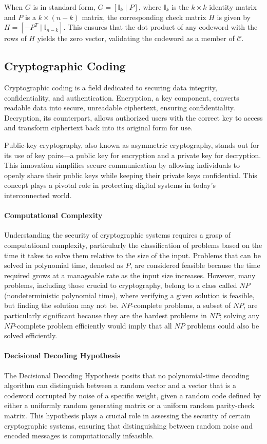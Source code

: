 When \(G\) is in standard form, \( G = [\mathbb{I}_k \mid P] \), where \(\mathbb{I}_k\) is the \(k \times k\) identity matrix and \(P\) is a \(k \times (n-k)\) matrix, the corresponding check matrix \(H\) is given by \( H = [-P^T \mid \mathbb{I}_{n-k}] \). This ensures that the dot product of any codeword with the rows of \(H\) yields the zero vector, validating the codeword as a member of \(\mathcal{C}\).

\subsection{Cryptographic Coding}
Cryptographic coding is a field dedicated to securing data integrity, confidentiality, and authentication. Encryption, a key component, converts readable data into secure, unreadable ciphertext, ensuring confidentiality. Decryption, its counterpart, allows authorized users with the correct key to access and transform ciphertext back into its original form for use.

Public-key cryptography, also known as asymmetric cryptography, stands out for its use of key pairs—a public key for encryption and a private key for decryption. This innovation simplifies secure communication by allowing individuals to openly share their public keys while keeping their private keys confidential. This concept plays a pivotal role in protecting digital systems in today's interconnected world.

\paragraph{Computational Complexity}
Understanding the security of cryptographic systems requires a grasp of computational complexity, particularly the classification of problems based on the time it takes to solve them relative to the size of the input. Problems that can be solved in polynomial time, denoted as $P$, are considered feasible because the time required grows at a manageable rate as the input size increases. However, many problems, including those crucial to cryptography, belong to a class called $NP$ (nondeterministic polynomial time), where verifying a given solution is feasible, but finding the solution may not be. $NP$-complete problems, a subset of $NP$, are particularly significant because they are the hardest problems in $NP$; solving any $NP$-complete problem efficiently would imply that all $NP$ problems could also be solved efficiently.

\paragraph{Decisional Decoding Hypothesis}
The Decisional Decoding Hypothesis posits that no polynomial-time decoding algorithm can distinguish between a random vector and a vector that is a codeword corrupted by noise of a specific weight, given a random code defined by either a uniformly random generating matrix or a uniform random parity-check matrix. This hypothesis plays a crucial role in assessing the security of certain cryptographic systems, ensuring that distinguishing between random noise and encoded messages is computationally infeasible.

